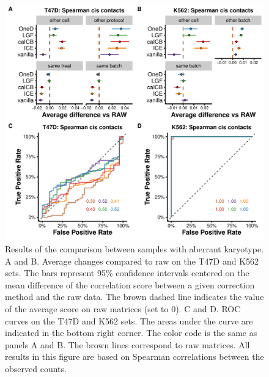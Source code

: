 \documentclass[12pt]{report}
\begin{document}
\begin{figure}
\centerline{\includegraphics[width=\textwidth]{img/correlation_aberrant_spearman.pdf}}
\caption{
Results of the comparison between samples with aberrant karyotype. A and
B. Average changes compared to raw on the T47D and K562 sets. The bars
represent 95\% confidence intervals centered on the mean difference of the
correlation score between a given correction method and the raw data. The
brown dashed line indicates the value of the average score on raw matrices
(set to 0). C and D. ROC curves on the T47D and K562 sets. The areas under
the curve are indicated in the bottom right corner. The color code is the
same as panels A and B. The brown lines correspond to raw matrices. All
results in this figure are based on Spearman correlations between the
observed counts.}
\end{figure}
\end{document}
